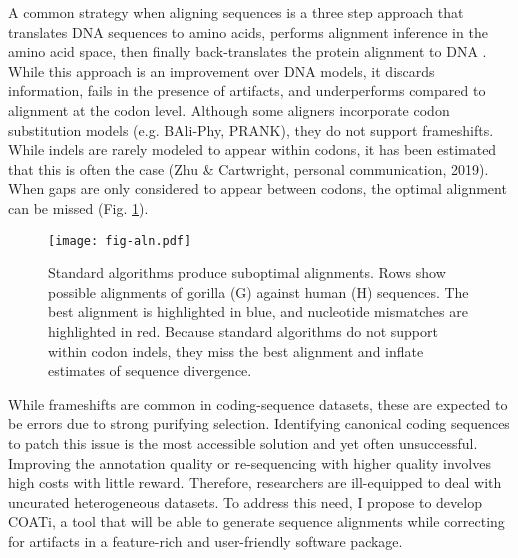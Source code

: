A common strategy when aligning sequences is a three step approach that
translates DNA sequences to amino acids, performs alignment inference in the
amino acid space, then finally  back-translates the protein alignment to DNA
\parencite{bininda2005transalign, abascal2010translatorx}.
While this approach is an improvement over DNA models, it discards information,
fails in the presence of artifacts, and underperforms compared to alignment at
the codon level.
Although some aligners incorporate codon substitution models (e.g. BAli-Phy,
PRANK), they do not support frameshifts.
While indels are rarely modeled to appear within codons, it has been estimated
that this is often the case (Zhu \& Cartwright, personal communication, 2019).
When gaps are only considered to appear between codons, the optimal alignment
can be missed (Fig. \ref{fig:indels}).

\begin{figure}[h!]
  \begin{minipage}[c]{0.6\textwidth}
    \texttt{[image: fig-aln.pdf]}
  \end{minipage}\hfill
  \begin{minipage}[c]{0.4\textwidth}
	\caption{Standard algorithms produce suboptimal alignments.
		Rows show possible alignments of gorilla (G) against human (H) sequences.
		The best alignment is highlighted in blue, and nucleotide mismatches are highlighted in red.
		Because standard algorithms do not support within codon indels, they miss the best
		alignment and inflate estimates of sequence divergence.}
	\label{fig:indels}
  \end{minipage}
\end{figure}

While frameshifts are common in coding-sequence datasets, these are expected to
be errors due to strong purifying selection.
Identifying canonical coding sequences to patch this issue is the most
accessible solution and yet often unsuccessful.
Improving the annotation quality or re-sequencing with higher quality involves
high costs with little reward.
Therefore, researchers are ill-equipped to deal with uncurated heterogeneous
datasets.
To address this need, I propose to develop COATi, a tool that will be able to
generate sequence alignments while correcting for artifacts in a feature-rich
and user-friendly software package.

